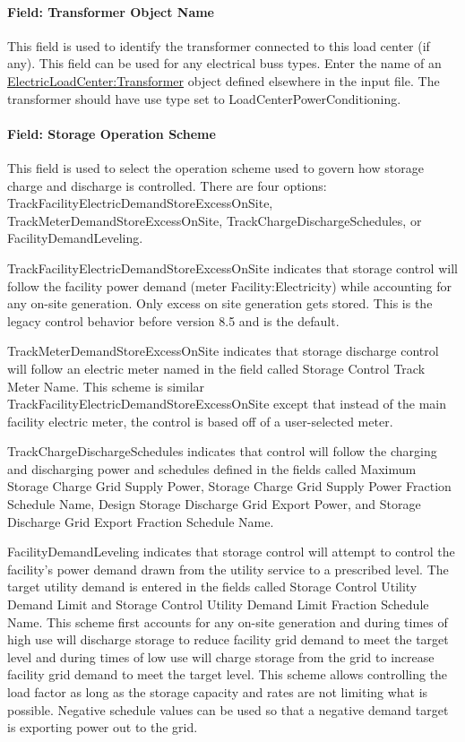 \paragraph{Field: Transformer Object Name}\label{field-transformer-object-name}

This field is used to identify the transformer connected to this load center (if any). This field can be used for any electrical buss types. Enter the name of an \hyperref[electricloadcentertransformer]{ElectricLoadCenter:Transformer} object defined elsewhere in the input file. The transformer should have use type set to LoadCenterPowerConditioning.

\paragraph{Field: Storage Operation Scheme}\label{field-storage-operation-scheme}

This field is used to select the operation scheme used to govern how storage charge and discharge is controlled. There are four options: TrackFacilityElectricDemandStoreExcessOnSite, TrackMeterDemandStoreExcessOnSite, TrackChargeDischargeSchedules, or FacilityDemandLeveling.

TrackFacilityElectricDemandStoreExcessOnSite indicates that storage control will follow the facility power demand (meter Facility:Electricity) while accounting for any on-site generation. Only excess on site generation gets stored. This is the legacy control behavior before version 8.5 and is the default.

TrackMeterDemandStoreExcessOnSite indicates that storage discharge control will follow an electric meter named in the field called Storage Control Track Meter Name. This scheme is similar TrackFacilityElectricDemandStoreExcessOnSite except that instead of the main facility electric meter, the control is based off of a user-selected meter.

TrackChargeDischargeSchedules indicates that control will follow the charging and discharging power and schedules defined in the fields called Maximum Storage Charge Grid Supply Power, Storage Charge Grid Supply Power Fraction Schedule Name, Design Storage Discharge Grid Export Power, and Storage Discharge Grid Export Fraction Schedule Name.

FacilityDemandLeveling indicates that storage control will attempt to control the facility's power demand drawn from the utility service to a prescribed level. The target utility demand is entered in the fields called Storage Control Utility Demand Limit and Storage Control Utility Demand Limit Fraction Schedule Name. This scheme first accounts for any on-site generation and during times of high use will discharge storage to reduce facility grid demand to meet the target level and during times of low use will charge storage from the grid to increase facility grid demand to meet the target level. This scheme allows controlling the load factor as long as the storage capacity and rates are not limiting what is possible. Negative schedule values can be used so that a negative demand target is exporting power out to the grid.

